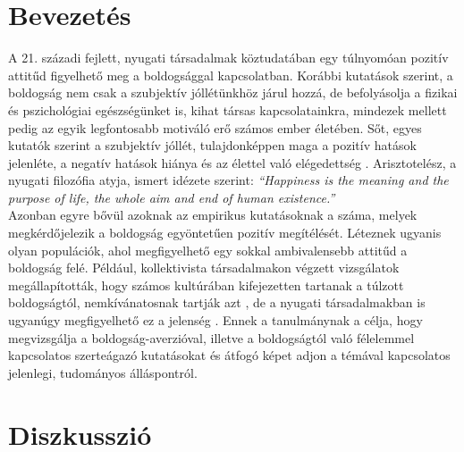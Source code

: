 \section*{Bevezetés}
A 21. századi fejlett, nyugati társadalmak köztudatában egy túlnyomóan pozitív attitűd figyelhető meg a boldogsággal kapcsolatban. Korábbi kutatások szerint, a boldogság nem csak a szubjektív jóllétünkhöz járul hozzá, de befolyásolja a fizikai és pszichológiai egészségünket is, kihat társas kapcsolatainkra, mindezek mellett pedig az egyik legfontosabb motiváló erő számos ember életében. Sőt, egyes kutatók szerint a szubjektív jóllét, tulajdonképpen maga a pozitív hatások jelenléte, a negatív hatások hiánya és az élettel való elégedettség \parencite{diener_suh_lucas_smith_1999}. Arisztotelész, a nyugati filozófia atyja, ismert idézete szerint: \textit{“Happiness is the meaning and the purpose of life, the whole aim and end of human existence.”} \medskip 
\\ Azonban egyre bővül azoknak az empirikus kutatásoknak a száma, melyek megkérdő\-jelezik  a boldogság egyöntetűen pozitív megítélését. Léteznek ugyanis olyan populációk, ahol megfigyelhető egy sokkal ambivalensebb attitűd a boldogság felé. Például, kollektivista társadalmakon végzett vizsgálatok megállapították, hogy számos kultúrá\-ban kifejezetten tartanak a túlzott boldogságtól, nemkívánatosnak tartják azt \parencite{joshanloo_weijers_2013, joshanloo_lepshokova_panyusheva_natalia_poon_yeung_sundaram_achoui_asano_igarashi}, de a nyugati társadalmakban is ugyanúgy megfigyelhető ez a jelenség \parencite{gilbert_mcewan_catarino_baiao_palmeira_2013}.  Ennek a tanulmánynak a célja, hogy megvizsgálja a boldogság-averzióval, illetve a boldogságtól való félelemmel kapcsolatos szerteágazó kutatásokat és átfogó képet adjon a témával kapcsolatos jelenlegi, tudományos álláspontról. \medskip 

\pagebreak
\section* {Diszkusszió}
